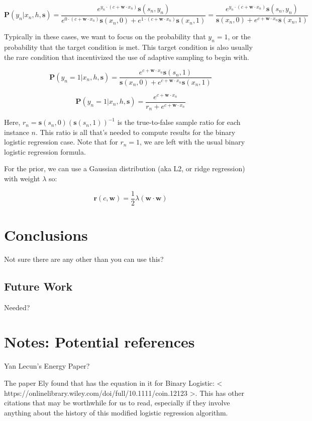 \documentclass[twoside]{article}
\begin{document}
\[\mathbf{P}(y_n|x_n,h,\mathbf{s})=\frac{e^{y_n \cdot (c+\mathbf{w} \cdot x_n)}\mathbf{s}(s_n,y_n)}{e^{0 \cdot (c+\mathbf{w} \cdot x_n)}\mathbf{s}(x_n,0)+e^{1 \cdot (c+\mathbf{w} \cdot x_n)}\mathbf{s}(x_n,1)}=\frac{e^{y_n \cdot (c+\mathbf{w} \cdot x_n)}\mathbf{s}(s_n,y_n)}{\mathbf{s}(x_n,0)+e^{c+\mathbf{w} \cdot x_n}\mathbf{s}(x_n,1)} \]

Typically in these cases, we want to focus on the probability that \(y_n = 1\), or the probability that the target condition is met. This target condition is also usually the rare condition that incentivized the use of adaptive sampling to begin with.

\[\mathbf{P}(y_n=1|x_n,h,\mathbf{s})=\frac{e^{c+\mathbf{w} \cdot x_n}\mathbf{s}(s_n,1)}{\mathbf{s}(x_n,0)+e^{c+\mathbf{w} \cdot x_n}\mathbf{s}(x_n,1)} \]

\[\mathbf{P}(y_n=1|x_n,h,\mathbf{s})=\frac{e^{c+\mathbf{w} \cdot x_n}}{r_n+e^{c+\mathbf{w} \cdot x_n}} \]

Here, \(r_n = \mathbf{s}(s_n,0)(\mathbf{s}(s_n,1))^{-1}\) is the true-to-false sample ratio for each instance \(n\). This ratio is all that's needed to compute results for the binary logistic regression case. Note that for \(r_n=1\), we are left with the usual binary logistic regression formula.

For the prior, we can use a Gaussian distribution (aka L2, or ridge regression) with weight \(\lambda\) so:

\[\mathbf{r}(c,\mathbf{w})=\frac{1}{2}\lambda(\mathbf{w} \cdot \mathbf{w})\]



\section{Conclusions}

Not sure there are any other than you can use this?

\subsection{Future Work}

Needed?

\section{Notes: Potential references}

Yan Lecun’s Energy Paper?

The paper Ely found that has the equation in it for Binary Logistic: < https://onlinelibrary.wiley.com/doi/full/10.1111/coin.12123 >. This has other citations that may be worthwhile for us to read, especially if they involve anything about the history of this modified logistic regression algorithm.
\end{document}
